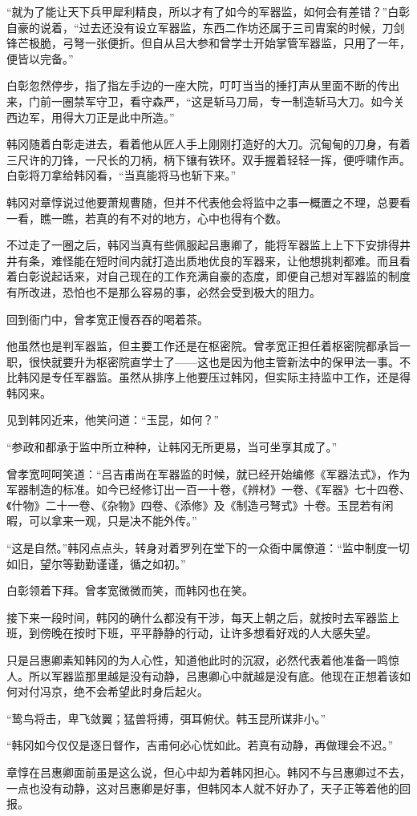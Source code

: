 “就为了能让天下兵甲犀利精良，所以才有了如今的军器监，如何会有差错？”白彰自豪的说着，“过去还没有设立军器监，东西二作坊还属于三司胄案的时候，刀剑锋芒极脆，弓弩一张便折。但自从吕大参和曾学士开始掌管军器监，只用了一年，便皆以完备。”

白彰忽然停步，指了指左手边的一座大院，叮叮当当的捶打声从里面不断的传出来，门前一圈禁军守卫，看守森严，“这是斩马刀局，专一制造斩马大刀。如今关西边军，用得大刀正是此中所造。”

韩冈随着白彰走进去，看着他从匠人手上刚刚打造好的大刀。沉甸甸的刀身，有着三尺许的刀锋，一尺长的刀柄，柄下镶有铁环。双手握着轻轻一挥，便呼啸作声。白彰将刀拿给韩冈看，“当真能将马也斩下来。”

韩冈对章惇说过他要萧规曹随，但并不代表他会将监中之事一概置之不理，总要看一看，瞧一瞧，若真的有不对的地方，心中也得有个数。

不过走了一圈之后，韩冈当真有些佩服起吕惠卿了，能将军器监上上下下安排得井井有条，难怪能在短时间内就打造出质地优良的军器来，让他想挑刺都难。而且看着白彰说起话来，对自己现在的工作充满自豪的态度，即便自己想对军器监的制度有所改进，恐怕也不是那么容易的事，必然会受到极大的阻力。

回到衙门中，曾孝宽正慢吞吞的喝着茶。

他虽然也是判军器监，但主要工作还是在枢密院。曾孝宽正担任着枢密院都承旨一职，很快就要升为枢密院直学士了——这也是因为他主管新法中的保甲法一事。不比韩冈是专任军器监。虽然从排序上他要压过韩冈，但实际主持监中工作，还是得韩冈来。

见到韩冈近来，他笑问道：“玉昆，如何？”

“参政和都承于监中所立种种，让韩冈无所更易，当可坐享其成了。”

曾孝宽呵呵笑道：“吕吉甫尚在军器监的时候，就已经开始编修《军器法式》，作为军器制造的标准。如今已经修订出一百一十卷，《辨材》一卷、《军器》七十四卷、《什物》二十一卷、《杂物》四卷、《添修》及《制造弓弩式》十卷。玉昆若有闲暇，可以拿来一观，只是决不能外传。”

“这是自然。”韩冈点点头，转身对着罗列在堂下的一众衙中属僚道：“监中制度一切如旧，望尔等勤勤谨谨，循之如初。”

白彰领着下拜。曾孝宽微微而笑，而韩冈也在笑。

接下来一段时间，韩冈的确什么都没有干涉，每天上朝之后，就按时去军器监上班，到傍晚在按时下班，平平静静的行动，让许多想看好戏的人大感失望。

只是吕惠卿素知韩冈的为人心性，知道他此时的沉寂，必然代表着他准备一鸣惊人。所以军器监那里越是没有动静，吕惠卿心中就越是没有底。他现在正想着该如何对付冯京，绝不会希望此时身后起火。

“鸷鸟将击，卑飞敛翼；猛兽将搏，弭耳俯伏。韩玉昆所谋非小。”

“韩冈如今仅仅是逐日督作，吉甫何必心忧如此。若真有动静，再做理会不迟。”

章惇在吕惠卿面前虽是这么说，但心中却为着韩冈担心。韩冈不与吕惠卿过不去，一点也没有动静，这对吕惠卿是好事，但韩冈本人就不好办了，天子正等着他的回报。

